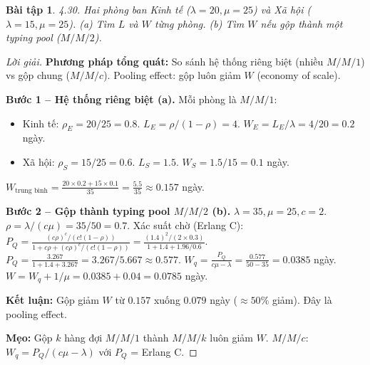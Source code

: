 \documentclass[8pt,a4paper]{article}
\newtheorem{exercise}{Bài tập}
\newenvironment{solution}{\begin{proof}[Lời giải]}{\end{proof}}
\begin{document}
\begin{exercise}
4.30. Hai phòng ban Kinh tế ($\lambda=20, \mu=25$) và Xã hội ($\lambda=15, \mu=25$). 
(a) Tìm $L$ và $W$ từng phòng. (b) Tìm $W$ nếu gộp thành một typing pool ($M/M/2$).
\end{exercise}
\begin{solution}
\textbf{Phương pháp tổng quát:} So sánh hệ thống riêng biệt (nhiều $M/M/1$) vs gộp chung ($M/M/c$). Pooling effect: gộp luôn giảm $W$ (economy of scale).

\textbf{Bước 1 -- Hệ thống riêng biệt (a).} Mỗi phòng là $M/M/1$:
\begin{itemize}[nosep]
\item Kinh tế: $\rho_E = 20/25 = 0.8$. $L_E = \rho/(1-\rho) = 4$. $W_E = L_E/\lambda = 4/20 = 0.2$ ngày.
\item Xã hội: $\rho_S = 15/25 = 0.6$. $L_S = 1.5$. $W_S = 1.5/15 = 0.1$ ngày.
\end{itemize}
$W_{\text{trung bình}} = \frac{20 \times 0.2 + 15 \times 0.1}{35} = \frac{5.5}{35} \approx \boxed{0.157}$ ngày.

\textbf{Bước 2 -- Gộp thành typing pool $M/M/2$ (b).} $\lambda = 35, \mu = 25, c = 2$. $\rho = \lambda/(c\mu) = 35/50 = 0.7$.
Xác suất chờ (Erlang C): $P_Q = \frac{(c\rho)^c/(c!(1-\rho))}{1 + c\rho + (c\rho)^c/(c!(1-\rho))} = \frac{(1.4)^2/(2 \times 0.3)}{1 + 1.4 + 1.96/0.6}$.
$P_Q = \frac{3.267}{1 + 1.4 + 3.267} = 3.267/5.667 \approx 0.577$.
$W_q = \frac{P_Q}{c\mu - \lambda} = \frac{0.577}{50 - 35} = 0.0385$ ngày.
$W = W_q + 1/\mu = 0.0385 + 0.04 = \boxed{0.0785}$ ngày.

\textbf{Kết luận:} Gộp giảm $W$ từ $0.157$ xuống $0.079$ ngày ($\approx 50\%$ giảm). Đây là pooling effect.

\textbf{Mẹo:} Gộp $k$ hàng đợi $M/M/1$ thành $M/M/k$ luôn giảm $W$. $M/M/c$: $W_q = P_Q/(c\mu - \lambda)$ với $P_Q$ = Erlang C.
\end{solution}
\end{document}
